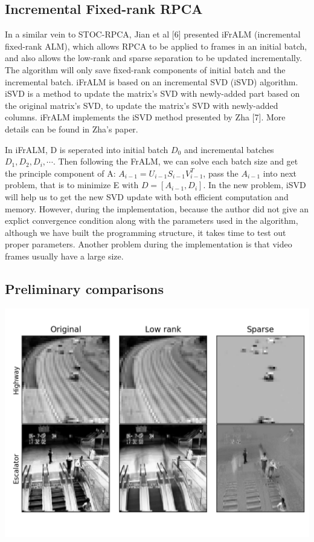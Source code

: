 \documentclass[oneside]{article}
\begin{document}
\subsection{Incremental Fixed-rank RPCA}
In a similar vein to STOC-RPCA, Jian et al [6] presented iFrALM (incremental fixed-rank ALM), which allows RPCA to be applied to frames in an initial batch, and also allows the low-rank and sparse separation to be updated incrementally. The algorithm will only save fixed-rank components of initial batch and the incremental batch.\newline\newline
iFrALM is based on an incremental SVD (iSVD) algorithm. iSVD is a method to update the matrix's SVD with newly-added part based on the original matrix's SVD, to update the matrix's SVD with newly-added columns. iFrALM implements the iSVD method presented by Zha [7]. More details can be found in Zha's paper.

In iFrALM, D is seperated into initial batch $D_0$  and incremental batches $D_1, D_2, D_i, \cdots$. Then following the FrALM, we can solve each batch size and get the principle component of A: $A_{i- 1} = U_{i-1} S_{i-1} V^T_{i-1}$, pass the $A_{i-1}$ into next problem, that is to minimize E with $D = [A_{i -1}, D_i]$. In the new problem, iSVD will help us to get the new SVD update with both efficient computation and memory.\newline\newline
However, during the implementation, because the author did not give an explict convergence condition along with the parameters used in the algorithm, although we have built the programming structure, it takes time to test out proper parameters. Another problem during the implementation is that video frames usually have a large size.

\subsection{Preliminary comparisons}
\includegraphics[scale= 0.5]{montage_fpcp.png}
\end{document}
